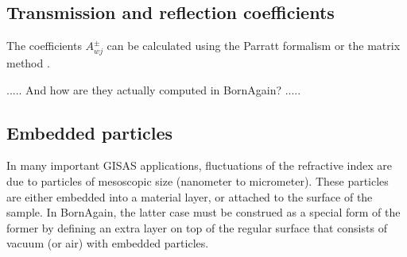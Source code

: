 \subsection{Transmission and reflection coefficients}

The coefficients $A^\pm_{wj}$
can be calculated using the Parratt formalism \cite{Par54}
or the matrix method \cite{BoWo99}.

..... And how are they actually computed in BornAgain? .....

\subsection{Embedded particles}

%
%
%
In many important GISAS applications,
fluctuations of the refractive index are due to particles
of mesoscopic size (nanometer to micrometer).
These particles are either embedded into a material layer,
or attached to the surface of the sample.
In BornAgain, the latter case must be construed as a special form of the former
by defining an extra layer on top of the regular surface that
consists of vacuum (or air) with embedded particles.

